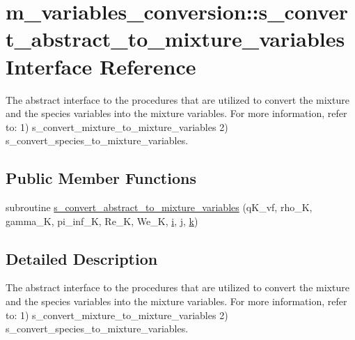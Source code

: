 \hypertarget{interfacem__variables__conversion_1_1s__convert__abstract__to__mixture__variables}{}\section{m\+\_\+variables\+\_\+conversion\+:\+:s\+\_\+convert\+\_\+abstract\+\_\+to\+\_\+mixture\+\_\+variables Interface Reference}
\label{interfacem__variables__conversion_1_1s__convert__abstract__to__mixture__variables}


The abstract interface to the procedures that are utilized to convert the mixture and the species variables into the mixture variables. For more information, refer to\+: 1) s\+\_\+convert\+\_\+mixture\+\_\+to\+\_\+mixture\+\_\+variables 2) s\+\_\+convert\+\_\+species\+\_\+to\+\_\+mixture\+\_\+variables.  


\subsection*{Public Member Functions}
\begin{DoxyCompactItemize}
\item 
subroutine \hyperlink{interfacem__variables__conversion_1_1s__convert__abstract__to__mixture__variables_a8bc488ab9d36a5b761fbe1dc5da4a1ce}{s\+\_\+convert\+\_\+abstract\+\_\+to\+\_\+mixture\+\_\+variables} (q\+K\+\_\+vf, rho\+\_\+K, gamma\+\_\+K, pi\+\_\+inf\+\_\+K, Re\+\_\+K, We\+\_\+K, \hyperlink{m__rhs_8f90_aaea4baed8fd8b780f6938f0dc1fb0f72}{i}, \hyperlink{m__rhs_8f90_aeadbc0ce9b66517f8fde156199772ec1}{j}, \hyperlink{m__rhs_8f90_af22c486581933c52df7d4aa306382074}{k})
\end{DoxyCompactItemize}


\subsection{Detailed Description}
The abstract interface to the procedures that are utilized to convert the mixture and the species variables into the mixture variables. For more information, refer to\+: 1) s\+\_\+convert\+\_\+mixture\+\_\+to\+\_\+mixture\+\_\+variables 2) s\+\_\+convert\+\_\+species\+\_\+to\+\_\+mixture\+\_\+variables. 


